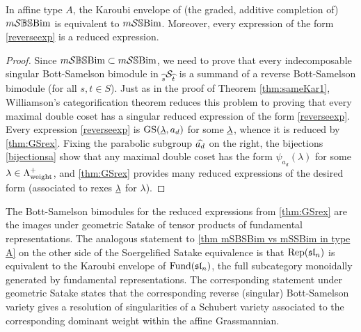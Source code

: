 \begin{theorem}\label{thm mSBSBim vs mSSBim in type A} In affine type $A$, the Karoubi envelope of (the graded, additive completion of) $m\mathcal{S}\mathbb{BS}\text{Bim}$ is equivalent to $m\mathcal{S}\mathbb{S}\text{Bim}$. Moreover, every expression of the form \eqref{reverseexp} is a reduced expression. \end{theorem}

\begin{proof} Since $m\mathcal{S}\mathbb{BS}\text{Bim} \subset m\mathcal{S}\mathbb{S}\text{Bim}$, we need to prove that every indecomposable singular Bott-Samelson bimodule in ${}_{\widehat{s}}\mathcal{S}_{\widehat{t}}$ is a summand of a reverse Bott-Samelson bimodule (for all $s, t \in S$). Just as in the proof of Theorem \ref{thm:sameKar1}, Williamson's categorification theorem reduces this problem to proving that every maximal double coset has a singular reduced expression of the form \eqref{reverseexp}. Every expression \eqref{reverseexp} is $\operatorname{GS}(\underline{\lambda},a_d)$ for some $\underline{\lambda}$, whence it is reduced by \cref{thm:GSrex}. Fixing the parabolic subgroup $\widehat{a_d}$ on the right, the bijections \eqref{bijectionsa} show that any maximal double coset has the form $\psi_{a_d}(\lambda)$ for some $\lambda \in \Lambda^+_{\operatorname{weight}}$, and \cref{thm:GSrex} provides many reduced expressions of the desired form (associated to rexes $\underline{\lambda}$ for $\lambda$). 
\end{proof}

\begin{remark} The Bott-Samelson bimodules for the reduced expressions from \cref{thm:GSrex} are the images under geometric Satake of tensor products of fundamental representations. The analogous statement to \cref{thm mSBSBim vs mSSBim in type A} on the other side of the Soergelified Satake equivalence is that $\operatorname{Rep}(\mathfrak{sl}_n)$ is equivalent to the Karoubi envelope of $\operatorname{Fund}(\mathfrak{sl}_n)$, the full subcategory monoidally generated by fundamental representations. The corresponding statement under geometric Satake states that the corresponding reverse (singular) Bott-Samelson variety gives a resolution of singularities of a Schubert variety associated to the corresponding dominant weight within the affine Grassmannian. \end{remark}

